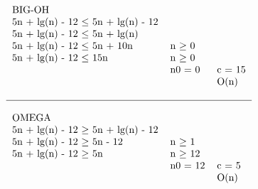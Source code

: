 \documentclass{article}
\begin{document}
\begin{math}
\begin{tabular}{ l l l }
\\
BIG-OH \\
5n + lg(n) - 12 $\le$ 5n + lg(n) - 12 \\
5n + lg(n) - 12 $\le$ 5n + lg(n) \\
5n + lg(n) - 12 $\le$ 5n + 10n & n $\ge$ 0 \\
5n + lg(n) - 12 $\le$ 15n & n $\ge$ 0 \\
& n0 = 0 & c = 15 \\
& & O(n) \\
\\
\hline
\\
OMEGA \\
5n + lg(n) - 12 $\ge$ 5n + lg(n) - 12 \\
5n + lg(n) - 12 $\ge$ 5n - 12 & n $\ge$ 1 \\
5n + lg(n) - 12 $\ge$ 5n & n $\ge$ 12 \\
& n0 = 12 & c = 5 \\
& & O(n) \\


\end{tabular}
\end{math}
\end{document}
